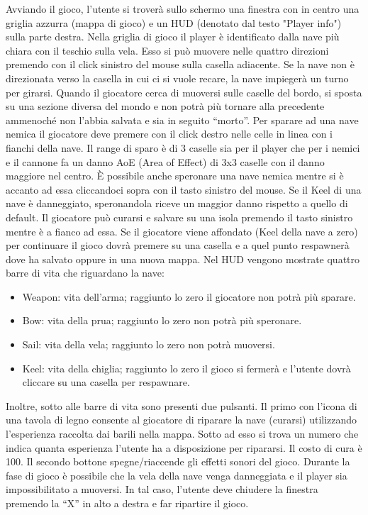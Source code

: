 \documentclass[a4paper,12pt]{report}
\begin{document}
Avviando il gioco, l'utente si troverà sullo schermo una finestra con in centro una griglia azzurra (mappa di gioco) e un HUD (denotato dal testo "Player info") sulla parte destra.
%
Nella griglia di gioco il player è identificato dalla nave più chiara con il teschio sulla vela.
%
Esso si può muovere nelle quattro direzioni premendo con il click sinistro del mouse sulla casella adiacente.
%
Se la nave non è direzionata verso la casella in cui ci si vuole recare, la nave impiegerà un turno per girarsi.
%
Quando il giocatore cerca di muoversi sulle caselle del bordo, si sposta su una sezione diversa del mondo e non potrà più tornare alla precedente ammenoché non l'abbia salvata e sia in seguito ``morto''.
%
Per sparare ad una nave nemica il giocatore deve premere con il click destro nelle celle in linea con i fianchi della nave.
%
Il range di sparo è di 3 caselle sia per il player che per i nemici e il cannone fa un danno AoE (Area of Effect) di 3x3 caselle con il danno maggiore nel centro.
%
È possibile anche speronare una nave nemica mentre si è accanto ad essa cliccandoci sopra con il tasto sinistro del mouse.
%
Se il Keel di una nave è danneggiato, speronandola riceve un maggior danno rispetto a quello di default.
%
Il giocatore può curarsi e salvare su una isola premendo il tasto sinistro mentre è a fianco ad essa.
%
Se il giocatore viene affondato (Keel della nave a zero) per continuare il gioco dovrà premere su una casella e a quel punto respawnerà dove ha salvato oppure in una nuova mappa.
%
\newline
Nel HUD vengono mostrate quattro barre di vita che riguardano la nave:
\begin{itemize}
	\item Weapon: vita dell'arma; raggiunto lo zero il giocatore non potrà più sparare.
	\item Bow: vita della prua; raggiunto lo zero non potrà più speronare.
	\item Sail: vita della vela; raggiunto lo zero non potrà muoversi.
	\item Keel: vita della chiglia; raggiunto lo zero il gioco si fermerà e l'utente dovrà cliccare su una casella per respawnare.
\end{itemize}
Inoltre, sotto alle barre di vita sono presenti due pulsanti.
%
Il primo con l'icona di una tavola di legno consente al giocatore di riparare la nave (curarsi) utilizzando l'esperienza raccolta dai barili nella mappa.
%
Sotto ad esso si trova un numero che indica quanta esperienza l'utente ha a disposizione per ripararsi. Il costo di cura è 100.
%
Il secondo bottone spegne/riaccende gli effetti sonori del gioco.
\newline
Durante la fase di gioco è possibile che la vela della nave venga danneggiata e il player sia impossibilitato a muoversi.
%
In tal caso, l'utente deve chiudere la finestra premendo la ``X'' in alto a destra e far ripartire il gioco.
\end{document}
